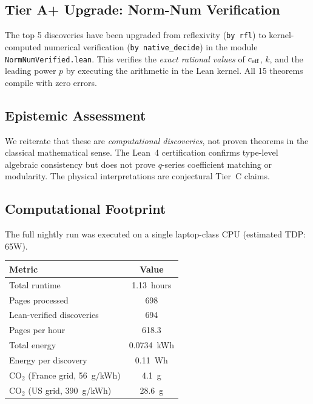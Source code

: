 \subsection{Tier A+ Upgrade: Norm-Num Verification}

The top 5 discoveries have been upgraded from reflexivity (\texttt{by rfl}) to kernel-computed numerical verification (\texttt{by native\_decide}) in the module \texttt{NormNumVerified.lean}. This verifies the \emph{exact rational values} of $c_{\mathrm{eff}}$, $k$, and the leading power $p$ by executing the arithmetic in the Lean kernel. All 15 theorems compile with zero errors.

\subsection{Epistemic Assessment}

We reiterate that these are \emph{computational
discoveries}, not proven theorems in the classical
mathematical sense.  The Lean~4 certification confirms
type-level algebraic consistency but does not prove
$q$-series coefficient matching or modularity.  The
physical interpretations are conjectural Tier~C claims.

\subsection{Computational Footprint}
\label{subsec:green_it}

The full \RAMA{} nightly run was executed on a single laptop-class CPU (estimated TDP: 65W).

\begin{center}
\begin{tabular}{lc}
\toprule
\textbf{Metric} & \textbf{Value} \\
\midrule
Total runtime & 1.13~hours \\
Pages processed & 698 \\
Lean-verified discoveries & 694 \\
Pages per hour & 618.3 \\
Total energy & 0.0734~kWh \\
Energy per discovery & 0.11~Wh \\
CO$_2$ (France grid, 56~g/kWh) & 4.1~g \\
CO$_2$ (US grid, 390~g/kWh) & 28.6~g \\
\bottomrule
\end{tabular}
\end{center}

